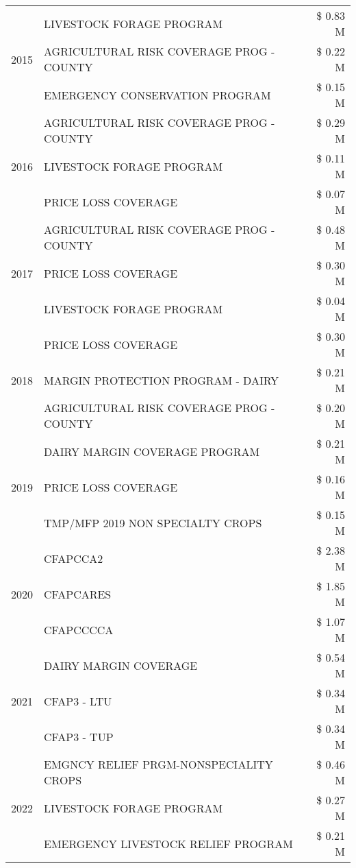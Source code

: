 \begin{tabular}{llr}
\cline{1-3}
\multirow[t]{3}{*}{2015} & LIVESTOCK FORAGE PROGRAM & \$ 0.83 M \\
 & AGRICULTURAL RISK COVERAGE PROG - COUNTY & \$ 0.22 M \\
 & EMERGENCY CONSERVATION PROGRAM & \$ 0.15 M \\
\cline{1-3}
\multirow[t]{3}{*}{2016} & AGRICULTURAL RISK COVERAGE PROG - COUNTY & \$ 0.29 M \\
 & LIVESTOCK FORAGE PROGRAM & \$ 0.11 M \\
 & PRICE LOSS COVERAGE & \$ 0.07 M \\
\cline{1-3}
\multirow[t]{3}{*}{2017} & AGRICULTURAL RISK COVERAGE PROG - COUNTY & \$ 0.48 M \\
 & PRICE LOSS COVERAGE & \$ 0.30 M \\
 & LIVESTOCK FORAGE PROGRAM & \$ 0.04 M \\
\cline{1-3}
\multirow[t]{3}{*}{2018} & PRICE LOSS COVERAGE & \$ 0.30 M \\
 & MARGIN PROTECTION PROGRAM - DAIRY & \$ 0.21 M \\
 & AGRICULTURAL RISK COVERAGE PROG - COUNTY & \$ 0.20 M \\
\cline{1-3}
\multirow[t]{3}{*}{2019} & DAIRY MARGIN COVERAGE PROGRAM & \$ 0.21 M \\
 & PRICE LOSS COVERAGE & \$ 0.16 M \\
 & TMP/MFP 2019 NON SPECIALTY CROPS & \$ 0.15 M \\
\cline{1-3}
\multirow[t]{3}{*}{2020} & CFAPCCA2 & \$ 2.38 M \\
 & CFAPCARES & \$ 1.85 M \\
 & CFAPCCCCA & \$ 1.07 M \\
\cline{1-3}
\multirow[t]{3}{*}{2021} & DAIRY MARGIN COVERAGE & \$ 0.54 M \\
 & CFAP3 - LTU & \$ 0.34 M \\
 & CFAP3 - TUP & \$ 0.34 M \\
\cline{1-3}
\multirow[t]{3}{*}{2022} & EMGNCY RELIEF PRGM-NONSPECIALITY CROPS & \$ 0.46 M \\
 & LIVESTOCK FORAGE PROGRAM & \$ 0.27 M \\
 & EMERGENCY LIVESTOCK RELIEF PROGRAM & \$ 0.21 M \\
\cline{1-3}
\bottomrule
\end{tabular}
